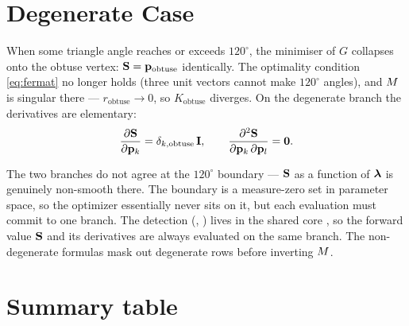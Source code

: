 \documentclass[11pt,a4paper]{article}
\begin{document}
\section{Degenerate Case}
\label{sec:degenerate}

When some triangle angle reaches or exceeds $120^\circ$, the minimiser of
$G$ collapses onto the obtuse vertex: $\mathbf{S} = \mathbf{p}_{\text{obtuse}}$ identically.
The optimality condition \eqref{eq:fermat} no longer holds (three unit
vectors cannot make $120^\circ$ angles), and $M$ is singular there ---
$r_{\text{obtuse}}\to0$, so $K_{\text{obtuse}}$ diverges.  On the degenerate
branch the derivatives are elementary:
\begin{equation}
  \dfrac{\partial \mathbf{S}}{\partial \mathbf{p}_{k}} = \delta_{k,\text{obtuse}}\,\mathbf{I},
  \qquad
  \dfrac{\partial^2 \mathbf{S}}{\partial \mathbf{p}_{k}\,\partial \mathbf{p}_{l}} = \mathbf{0}.
\end{equation}

\begin{remark}
The two branches do not agree at the $120^\circ$ boundary --- $\mathbf{S}$ as a
function of $\boldsymbol{\lambda}$ is genuinely non-smooth there.  The boundary is a
measure-zero set in parameter space, so the optimizer essentially never sits
on it, but each evaluation must commit to one branch.  The detection
(, ) lives in the shared core
, so the forward value $\mathbf{S}$ and its derivatives
are always evaluated on the same branch.  The non-degenerate formulas mask
out degenerate rows before inverting $M$.
\end{remark}

\section*{Summary table}
\end{document}
